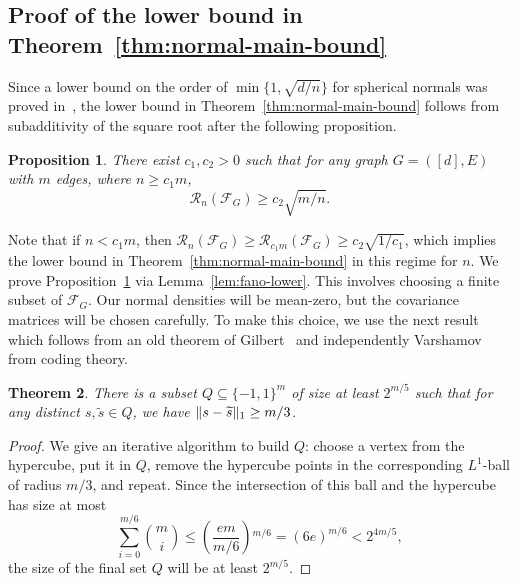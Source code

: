 \documentclass[letterpaper]{amsart}
\DeclarePairedDelimiter{\norm}{\lVert}{\rVert}
\newcommand{\sF}{\mathcal{F}}
\newcommand{\sR}{\mathcal{R}}
\let\originalleft\left
\let\originalright\right
\def\left#1{\mathopen{}\originalleft#1}
\def\right#1{\originalright#1\mathclose{}}
\newcommand{\seclabel}[1]{\label{sec:#1}}
\newtheorem{thm}{Theorem}{\bfseries}{\itshape}
\newcommand{\thmlabel}[1]{\label{thm:#1}}
\newcommand{\thmref}[1]{Theorem~\ref{thm:#1}}
\numberwithin{thm}{section}
\newcommand{\lemref}[1]{Lemma~\ref{lem:#1}}
\newtheorem{prop}[thm]{Proposition}{\bfseries}{\itshape}
\newcommand{\proplabel}[1]{\label{prop:#1}}
\newcommand{\propref}[1]{Proposition~\ref{prop:#1}}
\theoremstyle{definition}
\theoremstyle{plain}
\renewcommand{\tilde}[1]{\widetilde{#1}}
\begin{document}
\subsection{Proof of the lower bound in \thmref{normal-main-bound}}\seclabel{normal-lower}
Since a lower bound on the order of $\min\{1,\sqrt{d/n}\}$ for
spherical normals was proved in~\cite[Theorem~2]{acharya-lower-bound},
the lower bound in \thmref{normal-main-bound} follows from
subadditivity of the square root after the following proposition.
\begin{prop}\proplabel{normal-lower-bound}
  There exist $c_1, c_2 > 0$ such that for any graph $G = ([d], E)$
  with $m$ edges, where $n \ge c_1 m$,
  \[
    \sR_n(\sF_G) \ge c_2 \sqrt{m/n} .
  \]
\end{prop}
Note that if $n < c_1 m$, then
$\sR_n(\sF_G) \geq \sR_{c_1 m}(\sF_G) \ge c_2 \sqrt{1/c_1}$, which
implies the lower bound in \thmref{normal-main-bound} in this regime
for $n$. We prove \propref{normal-lower-bound} via
\lemref{fano-lower}.  This involves choosing a finite subset of
$\sF_G$.  Our normal densities will be mean-zero, but the covariance
matrices will be chosen carefully.  To make this choice, we use the
next result which follows from an old theorem of
Gilbert~\cite{gilbert} and independently Varshamov~\cite{varshamov}
from coding theory.
\begin{thm}\thmlabel{gilbert-varshamov}
  There is a subset $Q \subseteq \{-1, 1\}^m$ of size at least
  $2^{m/5}$ such that for any distinct $s, \tilde{s} \in Q$, we have
  $\norm{s - \tilde{s}}_1 \ge m/3$.
\end{thm}
\begin{proof}
  We give an iterative algorithm to build $Q$: choose a vertex from
  the hypercube, put it in $Q$, remove the hypercube points in the
  corresponding $L^1$-ball of radius $m/3$, and repeat.  Since the
  intersection of this ball and the hypercube has size at most
  \[
    \sum_{i=0}^{m/6} \binom{m}{i} \leq \left(\frac {em}{m/6}\right)^{m/6} = (6e)^{m/6} < 2^{4m/5},
  \]
  the size of the final set $Q$ will be at least $2^{m/5}$.
\end{proof}
\end{document}
